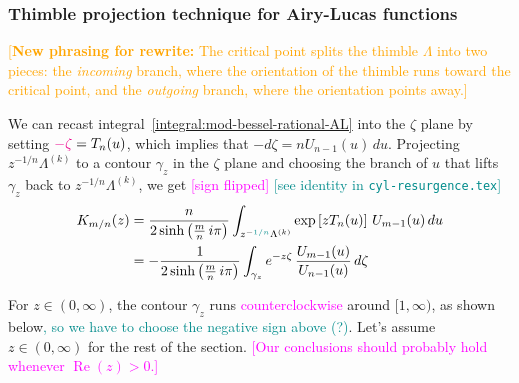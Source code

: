 \documentclass{article}
\theoremstyle{definition}
\begin{document}
\subsubsection{Thimble projection technique for Airy-Lucas functions}\label{contour-argument-AL}
\textcolor{orange}{[\textbf{New phrasing for rewrite:} The critical point splits the thimble $\Lambda$ into two pieces: the {\em incoming} branch, where the orientation of the thimble runs toward the critical point, and the {\em outgoing} branch, where the orientation points away.]}

We can recast integral~\eqref{integral:mod-bessel-rational-AL} into the $\zeta$ plane by setting $\textcolor{magenta}{-\zeta} = T_n(u)$, which implies that $-d\zeta = n U_{n-1}(u)\,du$. Projecting $z^{-1/n} \Lambda^{(k)}$ to a contour $\gamma_z$ in the $\zeta$ plane and choosing the branch of $u$ that lifts $\gamma_z$ back to $z^{-1/n} \Lambda^{(k)}$, we get \textcolor{magenta}{[sign flipped]} \textcolor{DarkCyan}{[see identity in \texttt{cyl-resurgence.tex}]}
\begin{align*}%
K_{m/n}(z) & = \frac{n}{2 \sinh\big(\tfrac{m}{n}\,i\pi\big)} \int_{z^{-\textcolor{DarkCyan}{1/n}}\Lambda^{(k)}} \exp\left[z T_n(u)\right]\,U_{m-1}(u)\,du \\
& = -\frac{1}{2  \sinh\big(\tfrac{m}{n}\,i\pi\big)} \int_{\gamma_z} e^{-z\zeta}\,\frac{U_{m-1}(u)}{U_{n-1}(u)}\,d\zeta %
\end{align*}


For $z \in (0, \infty)$, the contour $\gamma_z$ runs \textcolor{magenta}{counterclockwise} around $[1, \infty)$, as shown below\textcolor{DarkCyan}{, so we have to choose the negative sign above (?)}. Let's assume $z \in (0, \infty)$ for the rest of the section. \textcolor{magenta}{[Our conclusions should probably hold whenever $\operatorname{Re}(z) > 0$.]}
\end{document}
